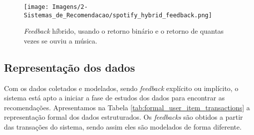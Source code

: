 \begin{figure}[hbt!]
    \centering
    \texttt{[image: Imagens/2-Sistemas\_de\_Recomendacao/spotify\_hybrid\_feedback.png]}
    \caption{\textit{Feedback} híbrido, usando o retorno binário e o retorno de quantas vezes se ouviu a música.}
    \label{fig:spotify_feedback}
\end{figure}

\subsection{Representação dos dados}
Com os dados coletados e modelados, sendo \textit{feedback} explícito ou implícito, o sistema está apto a iniciar a fase de estudos dos dados para encontrar as recomendações. Apresentamos na Tabela \ref{tab:formal_user_item_transactions} a representação formal dos dados estruturados. Os \textit{feedbacks} são obtidos a partir das transações do sistema, sendo assim eles são modelados de forma diferente.

